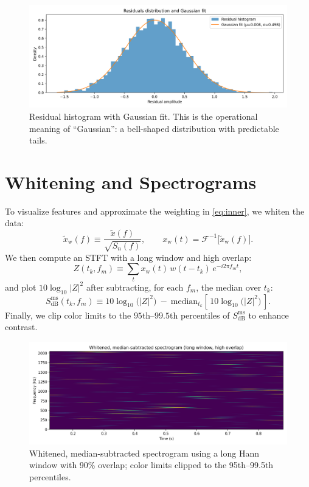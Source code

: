 \documentclass[11pt,a4paper]{article}
\begin{document}
\begin{figure}[h!]\centering
\includegraphics[width=0.95\linewidth]{fig3_residual_hist.png}
\caption{Residual histogram with Gaussian fit. This is the operational meaning of ``Gaussian'': a bell-shaped distribution with predictable tails.}
\label{fig:hist}
\end{figure}

\section{Whitening and Spectrograms}
To visualize features and approximate the weighting in \eqref{eq:inner}, we whiten the data:
\begin{equation}
\tilde x_{\mathrm{w}}(f) \equiv \frac{\tilde x(f)}{\sqrt{S_n(f)}}, \qquad
x_{\mathrm{w}}(t) = \mathcal{F}^{-1}\!\big[\tilde x_{\mathrm{w}}(f)\big]. \label{eq:whiten}
\end{equation}
We then compute an STFT with a long window and high overlap:
\begin{equation}
Z(t_k,f_m) \equiv \sum_{t} x_{\mathrm{w}}(t)\,w(t-t_k)\,e^{-i2\pi f_m t}, \label{eq:stft}
\end{equation}
and plot $10\log_{10}|Z|^2$ after subtracting, for each $f_m$, the median over $t_k$:
\begin{equation}
S_{\mathrm{dB}}^{\mathrm{ms}}(t_k,f_m) \equiv 10\log_{10}\!\big(|Z|^2\big)
~ - ~ \mathrm{median}_{t_k}\!\left[\,10\log_{10}\!\big(|Z|^2\big)\,\right]. \label{eq:medsub}
\end{equation}
Finally, we clip color limits to the $95$th--$99.5$th percentiles of $S_{\mathrm{dB}}^{\mathrm{ms}}$ to enhance contrast.

\begin{figure}[h!]\centering
\includegraphics[width=0.95\linewidth]{fig4_spectrogram.png}
\caption{Whitened, median-subtracted spectrogram using a long Hann window with 90\% overlap; color limits clipped to the 95th--99.5th percentiles.}
\label{fig:spec}
\end{figure}
\end{document}
